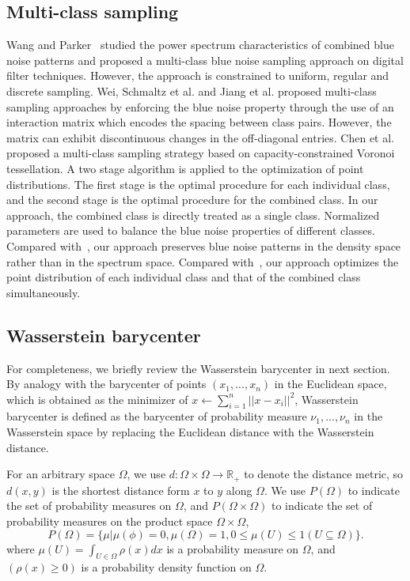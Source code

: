 \subsection{Multi-class sampling}
Wang and Parker~ studied the power spectrum characteristics of combined blue noise patterns and proposed a multi-class blue noise sampling approach on digital filter techniques.
However, the approach is constrained to uniform, regular and discrete sampling.
Wei, Schmaltz et al. and Jiang et al. proposed multi-class sampling
approaches by enforcing the blue noise property through the use of an interaction matrix which
encodes the spacing between class pairs.
However, the matrix can exhibit discontinuous changes in the off-diagonal entries.
Chen et al.~ proposed a multi-class sampling strategy based on capacity-constrained Voronoi tessellation.
A two stage algorithm
 is applied to the optimization of point distributions.
The first stage is the optimal procedure for each individual class,
and the second stage is the optimal procedure for the combined class.
In our approach,
the combined class is directly treated as a single class.
Normalized parameters are used to balance the blue noise properties of different classes.
Compared with~\cite{Wang:1999:BlueNoise},
our approach preserves blue noise patterns in the density space rather than in the spectrum space.
Compared with~\cite{chen:2012:variational},
our approach optimizes the point distribution of each individual class and that of the combined class simultaneously.


\subsection{Wasserstein barycenter}
For completeness, we briefly review the Wasserstein barycenter in  next section.
By analogy with the barycenter of points $(x_1,...,x_n)$ in the Euclidean space, which is obtained as the minimizer of $x\leftarrow\sum_{i=1}^n||x-x_i||^2$,
Wasserstein barycenter is defined as the barycenter of probability measure $\nu_1,...,\nu_n$ in the Wasserstein space
by replacing the Euclidean distance with the Wasserstein distance.

For an arbitrary space $\Omega$,
we use $d:\Omega\times\Omega\rightarrow{\mathbb{R}}_+$ to denote the distance metric,
so $d(x,y)$ is the shortest distance form $x$ to $y$ along $\Omega$.
We use $P(\Omega)$ to indicate the set of probability measures on $\Omega$,
and $P(\Omega\times\Omega)$ to indicate the set of probability measures on the product space $\Omega\times\Omega$,
\begin{equation*}
 P(\Omega)=\{\mu|\mu(\phi)=0,\mu(\Omega)=1, 0\leq\mu(U)\leq 1 (U\subseteq\Omega)\}.
\end{equation*}
where $\mu(U)=\int_{U\in\Omega}\rho(x)dx$ is a probability measure on $\Omega$,
and $(\rho(x)\geq0)$ is a probability density function on $\Omega$.

